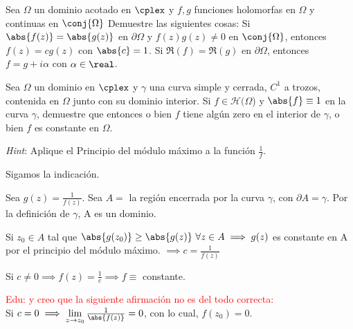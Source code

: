 \begin{problem}
Sea $\Omega$ un dominio acotado en $\cplex$ y $f,g$ funciones holomorfas en $\Omega$ y continuas en $\conj{\Omega}$ %
Demuestre las siguientes cosas:
\ppart Si $\abs{f(z)} = \abs{g(z)}$ en $\partial\Omega$ y $f(z)g(z) \neq 0$ en $\conj{\Omega}$, entonces $f(z) = c g(z)$ con $\abs{c} = 1$.
\ppart Si $\Re(f) = \Re(g)$ en $\partial\Omega$, entonces $f = g + i\alpha$ con $\alpha \in \real$.
\solution

\spart
\spart

\end{problem}

\begin{problem}
Sea $\Omega$ un dominio en $\cplex$ y $\gamma$ una curva simple y cerrada, $C^1$ a trozos, contenida en $\Omega$ junto con su dominio interior. Si $f \in \mathcal{H}(\Omega$) y $\abs{f} \equiv 1$ en la curva $\gamma$, demuestre que entonces o bien $f$ tiene algún zero en el interior de $\gamma$, o bien $f$ es constante en $\Omega$.

{\it Hint}: Aplique el Principio del módulo máximo a la función $\frac{1}{f}$.

\solution
{} Sigamos la indicación.

Sea $g(z) = \frac{1}{f(z)}$. Sea $A =$ la región encerrada por la curva $\gamma$, con $\partial A = \gamma$. Por la definición de $\gamma$, A es un dominio.

Si $z_0 \in A$ tal que $\abs{g(z_0)} \geq \abs{g(z)} \ \forall z \in A \implies g(z)$ es constante en A por el principio del módulo máximo. $\implies c = \frac{1}{f(z)}$

Si $c \neq 0 \implies f(z) = \frac{1}{c} \implies f \equiv $ constante.

\textcolor{red}{Edu: y creo que la siguiente afirmación no es del todo correcta:}\\
Si $c = 0 \implies \lim\limits_{z \to z_0} \frac{1}{\abs{f(z)}} = 0$, con lo cual, $f(z_0) = 0$.

\end{problem}


